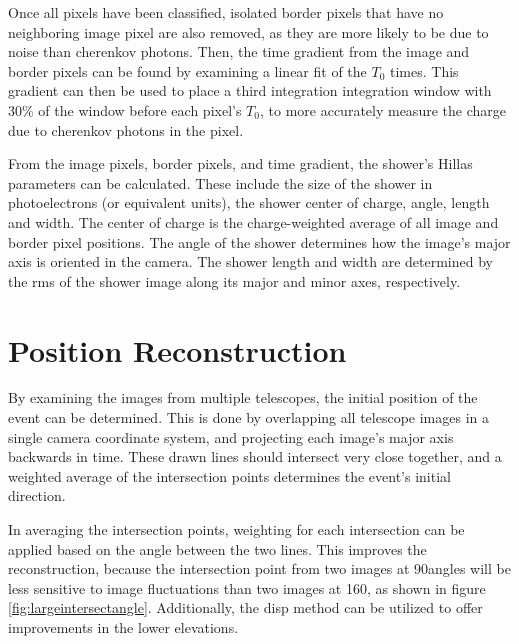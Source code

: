 Once all pixels have been classified, isolated border pixels that have no neighboring image pixel are also removed, as they are more likely to be due to noise than cherenkov photons.
Then, the time gradient from the image and border pixels can be found by examining a linear fit of the $T_{0}$ times.
This gradient can then be used to place a third integration integration window with 30\% of the window before each pixel's $T_{0}$, to more accurately measure the charge due to cherenkov photons in the pixel.

From the image pixels, border pixels, and time gradient, the shower's Hillas parameters can be calculated.
These include the size of the shower in photoelectrons (or equivalent units), the shower center of charge, angle, length and width.
The center of charge is the charge-weighted average of all image and border pixel positions.
The angle of the shower determines how the image's major axis is oriented in the camera.
The shower length and width are determined by the rms of the shower image along its major and minor axes, respectively.


\section{Position Reconstruction}\label{subsec:posrecon}
By examining the images from multiple telescopes, the initial position of the event can be determined.
This is done by overlapping all telescope images in a single camera coordinate system, and projecting each image's major axis backwards in time.
These drawn lines should intersect very close together, and a weighted average of the intersection points determines the event's initial direction.

In averaging the intersection points, weighting for each intersection can be applied based on the angle between the two lines.
This improves the reconstruction, because the intersection point from two images at 90\degree angles will be less sensitive to image fluctuations than two images at 160\degree, as shown in figure \ref{fig:largeintersectangle}.
Additionally, the disp method can be utilized to offer improvements in the lower elevations.

